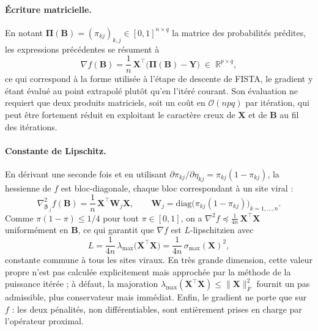 \documentclass[11pt,a4paper]{article}
\begin{document}
\paragraph{Écriture matricielle.}
En notant $\boldsymbol\Pi(\mathbf{B}) = (\pi_{kj})_{k,j} \in [0,1]^{n \times q}$
la matrice des probabilités prédites, les expressions précédentes se résument à
\[
\nabla f(\mathbf{B})
= \frac{1}{n}\,\mathbf{X}^\top \big(\boldsymbol\Pi(\mathbf{B}) - \mathbf{Y}\big)
\;\in\; \mathbb{R}^{p \times q},
\]
ce qui correspond à la forme utilisée à l'étape de descente de FISTA, le
gradient y étant évalué au point extrapolé plutôt qu'en l'itéré courant. Son
évaluation ne requiert que deux produits matriciels, soit un coût en
$\mathcal{O}(npq)$ par itération, qui peut être fortement réduit en exploitant
le caractère creux de $\mathbf{X}$ et de $\mathbf{B}$ au fil des itérations.

\paragraph{Constante de Lipschitz.}
En dérivant une seconde fois et en utilisant
$\partial \pi_{kj} / \partial \eta_{kj} = \pi_{kj}(1 - \pi_{kj})$, la hessienne
de $f$ est bloc-diagonale, chaque bloc correspondant à un site viral :
\[
\nabla^2_{\boldsymbol\beta_{\cdot j}} f(\mathbf{B})
= \frac{1}{n}\,\mathbf{X}^\top \mathbf{W}_j \mathbf{X},
\qquad
\mathbf{W}_j = \text{diag}\big(\pi_{kj}(1 - \pi_{kj})\big)_{k=1,\dots,n}.
\]
Comme $\pi(1-\pi) \leq 1/4$ pour tout $\pi \in [0,1]$, on a
$\nabla^2 f \preccurlyeq \frac{1}{4n}\,\mathbf{X}^\top\mathbf{X}$
uniformément en $\mathbf{B}$, ce qui garantit que $\nabla f$ est
$L$-lipschitzien avec
\[
L = \frac{1}{4n}\,\lambda_{\max}\!\big(\mathbf{X}^\top \mathbf{X}\big)
= \frac{1}{4n}\,\sigma_{\max}(\mathbf{X})^2 ,
\]
constante commune à tous les sites viraux. En très grande dimension, cette
valeur propre n'est pas calculée explicitement mais approchée par la méthode
de la puissance itérée ; à défaut, la majoration
$\lambda_{\max}(\mathbf{X}^\top\mathbf{X}) \leq \lVert \mathbf{X} \rVert_F^2$
fournit un pas admissible, plus conservateur mais immédiat. Enfin, le gradient
ne porte que sur $f$ : les deux pénalités, non différentiables, sont
entièrement prises en charge par l'opérateur proximal.
\end{document}
